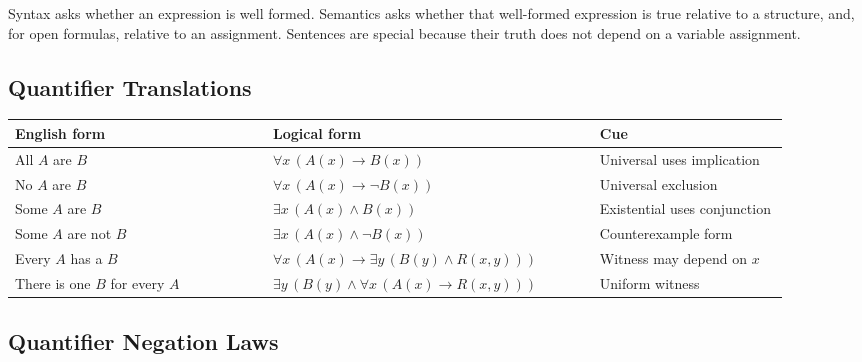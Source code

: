 \begin{remark*}[Interpretation]
Syntax asks whether an expression is well formed. Semantics asks whether that
well-formed expression is true relative to a structure, and, for open formulas,
relative to an assignment. Sentences are special because their truth does not
depend on a variable assignment.
\end{remark*}

\subsection*{Quantifier Translations}

\begin{center}
\renewcommand{\arraystretch}{1.3}
\begin{tabular}{p{0.30\linewidth} p{0.38\linewidth} p{0.22\linewidth}}
\toprule
\textbf{English form} & \textbf{Logical form} & \textbf{Cue} \\
\midrule
All $A$ are $B$ & $\forall x\,(A(x)\rightarrow B(x))$ & Universal uses implication \\
No $A$ are $B$ & $\forall x\,(A(x)\rightarrow \neg B(x))$ & Universal exclusion \\
Some $A$ are $B$ & $\exists x\,(A(x)\wedge B(x))$ & Existential uses conjunction \\
Some $A$ are not $B$ & $\exists x\,(A(x)\wedge \neg B(x))$ & Counterexample form \\
Every $A$ has a $B$ & $\forall x\,(A(x)\rightarrow \exists y\,(B(y)\wedge R(x,y)))$ & Witness may depend on $x$ \\
There is one $B$ for every $A$ & $\exists y\,(B(y)\wedge \forall x\,(A(x)\rightarrow R(x,y)))$ & Uniform witness \\
\bottomrule
\end{tabular}
\end{center}

\subsection*{Quantifier Negation Laws}

